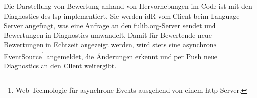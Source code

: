 Die Darstellung von Bewertung anhand von Hervorhebungen im Code ist mit den Diagnostics des \ac{lsp} implementiert.
Sie werden \ac{idR} vom Client beim Language Server angefragt, was eine Anfrage an den fulib.org-Server sendet und Bewertungen in Diagnostics umwandelt.
Damit für Bewertende neue Bewertungen in Echtzeit angezeigt werden, wird stets eine asynchrone EventSource\footnote{
    Web-Technologie für asynchrone Events ausgehend von einem \ac{http}-Server.
} angemeldet, die Änderungen erkennt und per Push neue Diagnostics an den Client weitergibt.
